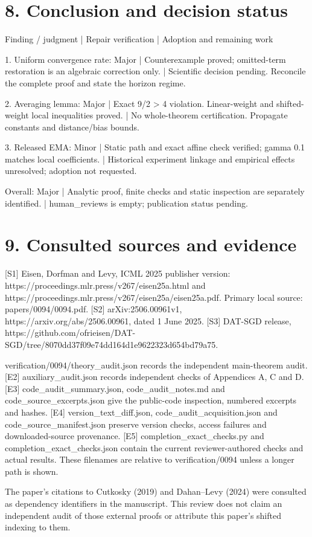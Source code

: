 \documentclass[10pt]{article}
\begin{document}
\section*{8. Conclusion and decision status}
Finding / judgment | Repair verification | Adoption and remaining work\par
1. Uniform convergence rate: Major | Counterexample proved; omitted-term restoration is an algebraic correction only. | Scientific decision pending. Reconcile the complete proof and state the horizon regime.\par
2. Averaging lemma: Major | Exact 9/2 > 4 violation. Linear-weight and shifted-weight local inequalities proved. | No whole-theorem certification. Propagate constants and distance/bias bounds.\par
3. Released EMA: Minor | Static path and exact affine check verified; gamma 0.1 matches local coefficients. | Historical experiment linkage and empirical effects unresolved; adoption not requested.\par
Overall: Major | Analytic proof, finite checks and static inspection are separately identified. | human\_reviews is empty; publication status pending.\par
\section*{9. Consulted sources and evidence}
[S1] Eisen, Dorfman and Levy, ICML 2025 publisher version: https://proceedings.mlr.press/v267/eisen25a.html and https://proceedings.mlr.press/v267/eisen25a/eisen25a.pdf. Primary local source: papers/0094/0094.pdf. [S2] arXiv:2506.00961v1, https://arxiv.org/abs/2506.00961, dated 1 June 2025. [S3] DAT-SGD release, https://github.com/ofrieisen/DAT-SGD/tree/8070dd37f09e74dd164d1e9622323d654bd79a75.\par
[E1] verification/0094/theory\_audit.json records the independent main-theorem audit. [E2] auxiliary\_audit.json records independent checks of Appendices A, C and D. [E3] code\_audit\_summary.json, code\_audit\_notes.md and code\_source\_excerpts.json give the public-code inspection, numbered excerpts and hashes. [E4] version\_text\_diff.json, code\_audit\_acquisition.json and code\_source\_manifest.json preserve version checks, access failures and downloaded-source provenance. [E5] completion\_exact\_checks.py and completion\_exact\_checks.json contain the current reviewer-authored checks and actual results. These filenames are relative to verification/0094 unless a longer path is shown.\par
The paper’s citations to Cutkosky (2019) and Dahan–Levy (2024) were consulted as dependency identifiers in the manuscript. This review does not claim an independent audit of those external proofs or attribute this paper’s shifted indexing to them.\par
\end{document}
